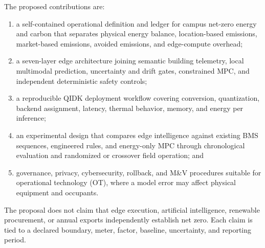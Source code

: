 The proposed contributions are:
\begin{enumerate}[leftmargin=*]
	\item a self-contained operational definition and ledger for campus net-zero energy and carbon that separates physical energy balance, location-based emissions, market-based emissions, avoided emissions, and edge-compute overhead;
	\item a seven-layer edge architecture joining semantic building telemetry, local multimodal prediction, uncertainty and drift gates, constrained MPC, and independent deterministic safety controls;
	\item a reproducible QIDK deployment workflow covering conversion, quantization, backend assignment, latency, thermal behavior, memory, and energy per inference;
	\item an experimental design that compares edge intelligence against existing BMS sequences, engineered rules, and energy-only MPC through chronological evaluation and randomized or crossover field operation; and
	\item governance, privacy, cybersecurity, rollback, and M\&V procedures suitable for operational technology (OT), where a model error may affect physical equipment and occupants.
\end{enumerate}

The proposal does not claim that edge execution, artificial intelligence, renewable procurement, or annual exports independently establish net zero. Each claim is tied to a declared boundary, meter, factor, baseline, uncertainty, and reporting period.
